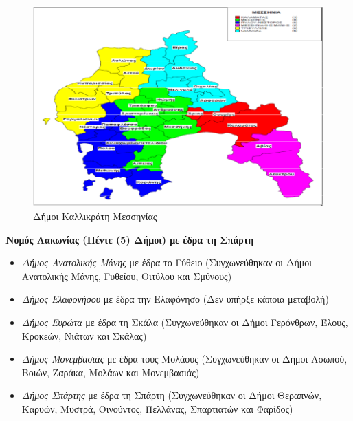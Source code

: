 \documentclass[12pt]{article}
\begin{document}
	\begin{figure} [H]
		\begin{center}
			\includegraphics [scale = 0.60] {messinia.png}
			\caption{Δήμοι Καλλικράτη Μεσσηνίας}
		\end{center}
	\end{figure}

	\textbf{Νομός Λακωνίας (Πέντε (5) Δήμοι) με έδρα τη Σπάρτη}
	
	\begin{itemize}
		\item \emph{Δήμος Ανατολικής Μάνης} με έδρα το Γύθειο (Συγχωνεύθηκαν οι Δήμοι Ανατολικής Μάνης, Γυθείου, Οιτύλου και Σμύνους)
		\item \emph{Δήμος Ελαφονήσου} με έδρα την Ελαφόνησο (Δεν υπήρξε κάποια μεταβολή)
		\item \emph{Δήμος Ευρώτα} με έδρα τη Σκάλα (Συγχωνεύθηκαν οι Δήμοι Γερόνθρων, Έλους, Κροκεών, Νιάτων και Σκάλας)
		\item \emph{Δήμος Μονεμβασιάς} με έδρα τους Μολάους (Συγχωνεύθηκαν οι Δήμοι Ασωπού, Βοιών, Ζαράκα, Μολάων και Μονεμβασιάς)
		\item \emph{Δήμος Σπάρτης} με έδρα τη Σπάρτη (Συγχωνεύθηκαν οι Δήμοι Θεραπνών, Καρυών, Μυστρά, Οινούντος, Πελλάνας, Σπαρτιατών και Φαρίδος)
	\end{itemize}
\end{document}
